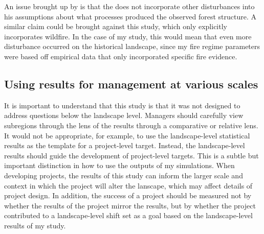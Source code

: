 An issue brought up by \citet{Fule2014} is that the \citep{Baker2014} does not incorporate other disturbances into his assumptions about what processes produced the observed forest structure. A similar claim could be brought against this study, which only explicitly incorporates wildfire. In the case of my study, this would mean that even more disturbance occurred on the historical landscape, since my fire regime parameters were based off empirical data that only incorporated specific fire evidence.


\subsection{Using results for management at various scales}
It is important to understand that this study is that it was not designed to address questions below the landscape level. Managers should carefully view subregions through the lens of the results through a comparative or relative lens. It would not be appropriate, for example, to use the landscape-level statistical results as the template for a project-level target. Instead, the landscape-level results should guide the development of project-level targets. This is a subtle but important distinction in how to use the outputs of my simulations. When developing projects, the results of this study can inform the larger scale and context in which the project will alter the lanscape, which may affect details of project design. In addition, the success of a project should be measured not by whether the results of the project mirror the results, but by whether the project contributed to a landscape-level shift set as a goal based on the landscape-level results of my study.

